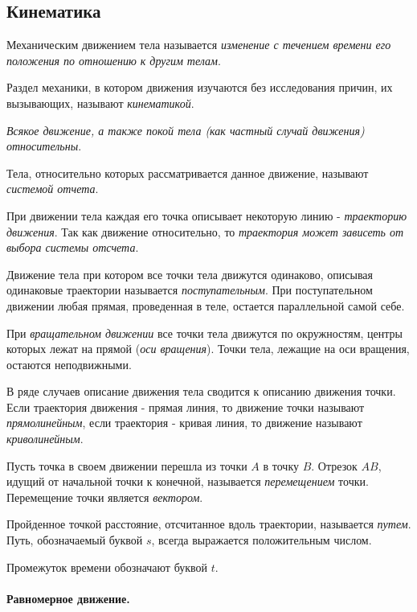 \documentclass[a4paper,12pt]{article}
\begin{document}
		\subsection*{Кинематика}
		Механическим движением тела называется \textit{изменение с течением времени его 
		положения по отношению к другим телам}.

		Раздел механики, в котором движения изучаются без исследования причин, их 
		вызывающих, называют \textit{кинематикой}.

		\textit{Всякое движение, а также покой тела (как частный случай движения) 
		относительны}.

		Тела, относительно которых рассматривается данное движение, называют \textit{системой 
		отчета}.

		При движении тела каждая его точка описывает некоторую линию - \textit{траекторию 
		движения}. Так как движение относительно, то \textit{траектория может зависеть от 
		выбора системы отсчета}.

		Движение тела при котором все точки тела движутся одинаково, описывая одинаковые
		траектории называется \textit{поступательным}. При поступательном движении любая
		прямая, проведенная в теле, остается параллельной самой себе.

		При \textit{вращательном движении} все точки тела движутся по окружностям, центры
		которых лежат на прямой (\textit{оси вращения}). Точки тела, лежащие на оси вращения,
		остаются неподвижными.

		В ряде случаев описание движения тела сводится к описанию движения точки.
		Если траектория движения - прямая линия, то движение точки называют 
		\textit{прямолинейным}, если траектория - кривая линия,  то движение называют
		\textit{криволинейным}.
		
		Пусть точка в своем движении перешла из точки $A$ в точку $B$. Отрезок $AB$, 
		идущий от начальной точки к конечной, называется \textit{перемещением} точки.
		Перемещение точки является \textit{вектором}.

		Пройденное точкой расстояние, отсчитанное вдоль траектории, называется 
		\textit{путем}. Путь, обозначаемый буквой $s$, всегда выражается положительным
		числом.

		Промежуток времени обозначают буквой $t$.

		\paragraph{Равномерное движение.} \
		
\end{document}
